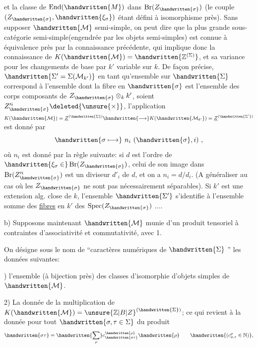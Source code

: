 et la classe de $\operatorname{End}(\handwritten{M})$ dans $\operatorname{Br}(Z_{\handwritten{\sigma}})$ (le couple $(Z_{\handwritten{\sigma}},\handwritten{\xi_\sigma})$ étant défini à isomorphisme près). Sans supposer $\handwritten{\mathcal{M}}$ semi\handwritten{\unsure{(}}-simple, on peut dire que la plus grande sous-catégorie semi-simple(engendrée par les objets semi-simples) est connue à équivalence près par la connaissance précédente, qui implique donc la connaissance de $K(\handwritten{\mathcal{M}})=\handwritten{\mathbb{Z}^{(\Sigma)}}$, et sa variance pour les changements de base par $k'$ variable sur $k$. De façon précise,$\handwritten{\Sigma'=\Sigma(\mathcal{M}_{k'})}$ en tant qu'ensemble sur $\handwritten{\Sigma}$ correspond à l'ensemble  dont la fibre  en $\handwritten{\sigma}$ est l'ensemble des corps composants de $Z_{\handwritten{\sigma}}\otimes_k k'$, soient $Z'^{i}_{\handwritten{\sigma}}\deleted{\unsure{\times}}$, l'application $K(\handwritten{\mathcal{M}})=\underline{Z}^{(\handwritten{\Sigma})}\handwritten{\longrightarrow}K(\handwritten{\mathcal{M}_{k'}})=\underline{Z}^{(\handwritten{\Sigma'})}$ est donné par
\[
\handwritten{\sigma\longmapsto}\ n_i\ (\handwritten{\sigma},i)\ ,
\]
où $n_i$ est donné par la règle suivante: si $d$ est  l'ordre de $\handwritten{\xi_\sigma\in}\operatorname{Br}(Z_{\handwritten{\sigma}})$, celui de son image dans $\operatorname{Br}(Z'^{i}_{\handwritten{\sigma}})$ est un  diviseur $d'_i$ de $d$, et on a $n_i=d/d_i$. (A généraliser au cas où les $Z_{\handwritten{\sigma}}$ ne sont pas nécessairement séparables). Si $k'$ est une  extension alg. close de $k$, l'ensemble $\handwritten{\Sigma'}$ s'identifie à l'ensemble somme des \uline{fibres} en $k'$ des $\operatorname{Spec}(Z_{\handwritten{\sigma}})$ ....

b) Supposons maintenant $\handwritten{\mathcal{M}}$  munie d'un produit tensoriel à contraintes d'associativité et commutativité, avec 1.

On désigne sous le nom de ``caractères numériques de $\handwritten{\Sigma}$ '' les données suivantes:

) l'ensemble (à bijection près)\inserted{\handwritten{$\Sigma$}} des  classes d'isomorphie d'objets simples de $\handwritten{\mathcal{M}}$.

2) La donnée de la multiplication de $K(\handwritten{\mathcal{M}})={\unsure{\mathbb{Z}|B|Z}}^{(\handwritten{\Sigma})}$; ce qui revient à la donnée pour tout $\handwritten{\sigma,\tau\in\Sigma}$ du produit
\[
\handwritten{\sigma\tau}=\handwritten{\sum_\rho}c_{\handwritten{\sigma\tau}}^{\handwritten{\rho}}\handwritten{\rho}\qquad\handwritten{(c_{\sigma,\tau}^{\rho}\in\mathbb{N})},
\]
